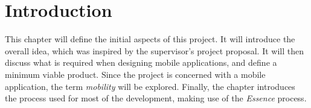 \setcounter{chapter}{-1}
\chapter{Introduction}
This chapter will define the initial aspects of this project.
It will introduce the overall idea, which was inspired by the supervisor's project proposal.
It will then discuss what is required when designing mobile applications, and define a minimum viable product.
Since the project is concerned with a mobile application, the term \textit{mobility} will be explored.
Finally, the chapter introduces the process used for most of the development, making use of the \textit{Essence} process.






